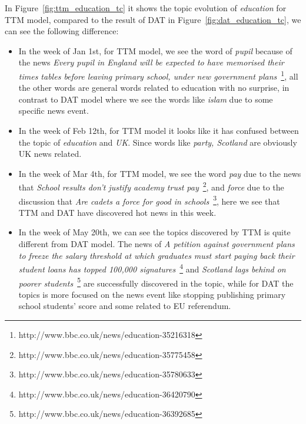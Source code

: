 In Figure~\ref{fig:ttm_education_tc} it shows the topic evolution of \textit{education} for TTM model, compared to the result of DAT in Figure~\ref{fig:dat_education_tc}, we can see the following difference:
\begin{itemize}
    \item In the week of Jan 1st, for TTM model, we see the word of \textit{pupil} because of the news \textit{Every pupil in England will be expected to have memorised their times tables before leaving primary school, under new government plans}~\footnote{http://www.bbc.co.uk/news/education-35216318}, all the other words are general words related to education with no surprise, in contrast to DAT model where we see the words like \textit{islam} due to some specific news event.
    \item In the week of Feb 12th, for TTM model it looks like it has confused between the topic of \textit{education} and \textit{UK}. Since words like \textit{party, Scotland} are obviously UK news related.
    \item In the week of Mar 4th, for TTM model, we see the word \textit{pay} due to the news that \textit{School results don't justify academy trust pay}~\footnote{http://www.bbc.co.uk/news/education-35775458}, and \textit{force} due to the discussion that \textit{Are cadets a force for good in schools}~\footnote{http://www.bbc.co.uk/news/education-35780633}, here we see that TTM and DAT have discovered hot news in this week.
    \item In the week of May 20th, we can see the topics discovered by TTM is quite different from DAT model. The news of \textit{A petition against government plans to freeze the salary threshold at which graduates must start paying back their student loans has topped 100,000 signatures}~\footnote{http://www.bbc.co.uk/news/education-36420790} and \textit{Scotland lags behind on poorer students}~\footnote{http://www.bbc.co.uk/news/education-36392685} are successfully discovered in the topic, while for DAT the topics is more focused on the news event like stopping publishing primary school students' score and some related to EU referendum.
\end{itemize}

